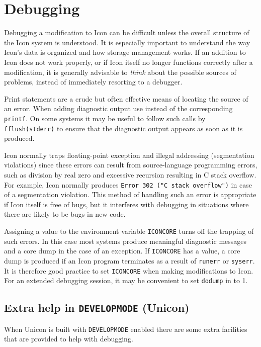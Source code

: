 \section{Debugging}

Debugging a modification to Icon can be difficult unless the overall structure of
the Icon system is understood. It is especially important to understand the way
Icon's data is organized and how storage management works. If an addition to
Icon does not work properly, or if Icon itself no longer functions correctly
after a modification, it is generally advisable to {\em think} about the
possible sources of problems, instead of immediately resorting to a debugger.

Print statements are a crude but often effective means of locating the source of
an error. When adding diagnostic output use
\noindent
instead of the corresponding \texttt{printf}. On some systems it may be useful
to follow such calls by \texttt{fflush(stderr)} to ensure that the diagnostic
output appears as soon as it is produced.

Icon normally traps floating-point exception and illegal addressing
(segmentation violations) since these errors can result from source-language
programming errors, such as division by real zero and excessive recursion
resulting in C stack overflow. For example, Icon normally produces
\texttt{Error 302 ("C stack overflow")} in case of a segmentation violation.
This method of handling such an error is appropriate if Icon itself is free of
bugs, but it interferes with debugging in situations where there are likely to
be bugs in new code.

Assigning a value to the environment variable \texttt{ICONCORE} turns off the
trapping of such errors. In this case most systems produce meaningful diagnostic
messages and a core dump in the case of an exception.  If \texttt{ICONCORE} has
a value, a core dump is produced if an Icon program terminates as a result of
\texttt{runerr} or \texttt{syserr}.  It is therefore good practice to set
\texttt{ICONCORE} when making modifications to Icon. For an extended debugging
session, it may be convenient to set \texttt{dodump} in  to 1.

\subsection{Extra help in \texttt{DEVELOPMODE} (Unicon)}
When Unicon is built with \texttt{DEVELOPMODE} enabled there are some extra
facilities that are provided to help with debugging.
